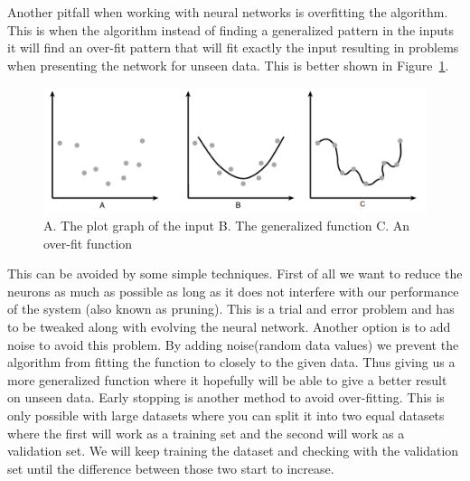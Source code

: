 Another pitfall when working with neural networks is overfitting the algorithm. This is when the algorithm instead of finding a generalized pattern in the inputs it will find an over-fit pattern that will fit exactly the input resulting in problems when presenting the network for unseen data. This is better shown in Figure~\ref{fig:overfitting}.
\begin{figure}[!ht]
\centering
\includegraphics[width=0.8\linewidth,natwidth=1262,natheight=415]{billeder/overfitting.png}
\caption{A. The plot graph of the input B. The generalized function C. An over-fit function \cite[P. 319]{buckland2002ai}}
\label{fig:overfitting}
\end{figure}
This can be avoided by some simple techniques. First of all we want to reduce the neurons as much as possible as long as it does not interfere with our performance of the system (also known as pruning). This is a trial and error problem and has to be tweaked along with evolving the neural network. Another option is to add noise to avoid this problem. By adding noise(random data values) we prevent the algorithm from fitting the function to closely to the given data. Thus giving us a more generalized function where it hopefully will be able to give a better result on unseen data. Early stopping is another method to avoid over-fitting. This is only possible with large datasets where you can split it into two equal datasets where the first will work as a training set and the second will work as a validation set. We will keep training the dataset and checking with the validation set until the difference between those two start to increase.

